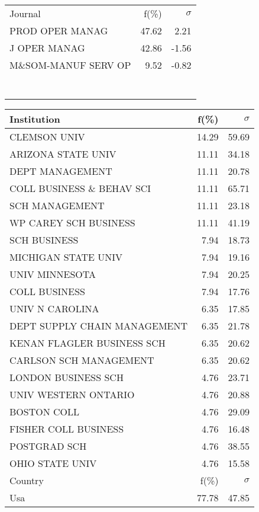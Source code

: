 \documentclass[a4paper,11pt]{report}
\begin{document}
\begin{landscape}
\begin{table}[!ht]
{\begin{tabular}{|l r r|}
 &  & \\
\hline
\hline
Journal & f(\%) & $\sigma$\\
\hline
PROD OPER MANAG & 47.62 & 2.21\\
J OPER MANAG & 42.86 & -1.56\\
M\&SOM-MANUF SERV OP & 9.52 & -0.82\\
 &  & \\
 &  & \\
 &  & \\
 &  & \\
 &  & \\
 &  & \\
 &  & \\
\hline
\end{tabular}
}
{\scriptsize\begin{tabular}{|l r r|}
\hline
Institution & f(\%) & $\sigma$\\
\hline
CLEMSON UNIV & 14.29 & 59.69\\
ARIZONA STATE UNIV & 11.11 & 34.18\\
DEPT MANAGEMENT & 11.11 & 20.78\\
COLL BUSINESS \& BEHAV SCI & 11.11 & 65.71\\
SCH MANAGEMENT & 11.11 & 23.18\\
WP CAREY SCH BUSINESS & 11.11 & 41.19\\
SCH BUSINESS & 7.94 & 18.73\\
MICHIGAN STATE UNIV & 7.94 & 19.16\\
UNIV MINNESOTA & 7.94 & 20.25\\
COLL BUSINESS & 7.94 & 17.76\\
UNIV N CAROLINA & 6.35 & 17.85\\
DEPT SUPPLY CHAIN MANAGEMENT & 6.35 & 21.78\\
KENAN FLAGLER BUSINESS SCH & 6.35 & 20.62\\
CARLSON SCH MANAGEMENT & 6.35 & 20.62\\
LONDON BUSINESS SCH & 4.76 & 23.71\\
UNIV WESTERN ONTARIO & 4.76 & 20.88\\
BOSTON COLL & 4.76 & 29.09\\
FISHER COLL BUSINESS & 4.76 & 16.48\\
POSTGRAD SCH & 4.76 & 38.55\\
OHIO STATE UNIV & 4.76 & 15.58\\
\hline
\hline
Country & f(\%) & $\sigma$\\
\hline
Usa & 77.78 & 47.85\\

\end{tabular}}
\end{table}
\end{landscape}
\end{document}
